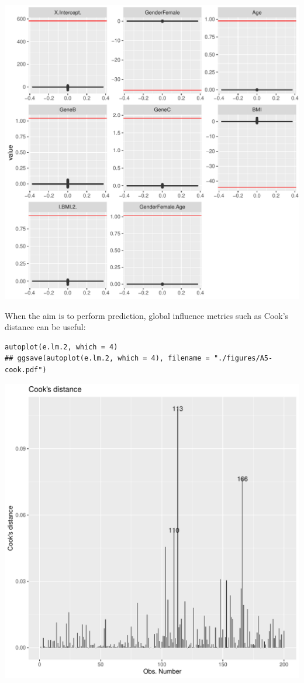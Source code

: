 \documentclass[12pt]{article}
\begin{document}
\begin{center}
\includegraphics[width=.9\linewidth]{./figures/A5-boxplot.pdf}
\end{center}

When the aim is to perform prediction, global influence metrics such
as Cook's distance can be useful:
\lstset{language=r,label= ,caption= ,captionpos=b,numbers=none}
\begin{lstlisting}
autoplot(e.lm.2, which = 4)
## ggsave(autoplot(e.lm.2, which = 4), filename = "./figures/A5-cook.pdf")
\end{lstlisting}

\begin{center}
\includegraphics[width=.9\linewidth]{./figures/A5-cook.pdf}
\end{center}
\end{document}
